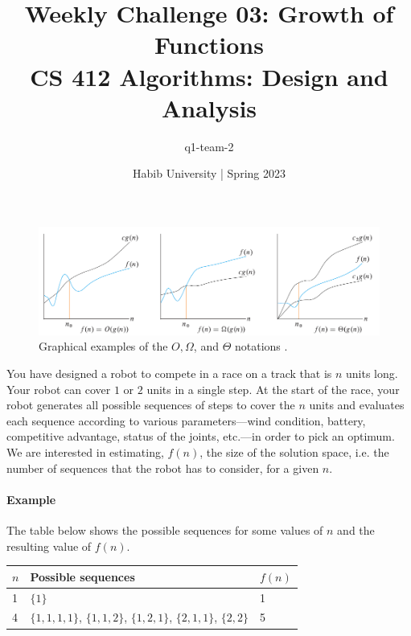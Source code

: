 \documentclass[a4paper]{exam}
\title{Weekly Challenge 03: Growth of Functions\\CS 412 Algorithms: Design and Analysis}
\author{q1-team-2}  %
\date{Habib University | Spring 2023}
\begin{document}
\maketitle

\begin{questions}


  \begin{figure}[!h]
    \centering
    \includegraphics[width=.95\textwidth]{asymptotic}

    \caption{Graphical examples of the $O, \Omega$, and $\Theta$ notations \cite{clrs}.}
    \label{fig:notation}
  \end{figure}

  You have designed a robot to compete in a race on a track that is $n$ units long. Your robot can cover $1$ or $2$ units in a single step. At the start of the race, your robot generates all possible sequences of steps to cover the $n$ units and evaluates each sequence according to various parameters---wind condition, battery, competitive advantage, status of the joints, etc.---in order to pick an optimum. We are interested in estimating, $f(n)$, the size of the solution space, i.e. the number of sequences that the robot has to consider, for a given $n$.

  \paragraph{Example} The table below shows the possible sequences for some values of $n$ and the resulting value of $f(n)$.

  \begin{tabular}{|l|l|l|}
    \hline
    $n$ & Possible sequences                                              & $f(n)$ \\
    \hline\hline
    1   & $\{1\}$                                                         & 1      \\
    4   & $\{1,1,1,1\}$, $\{1,1,2\}$, $\{1,2,1\}$, $\{2,1,1\}$, $\{2,2\}$ & 5      \\
    \hline
  \end{tabular}


\end{questions}
\end{document}
